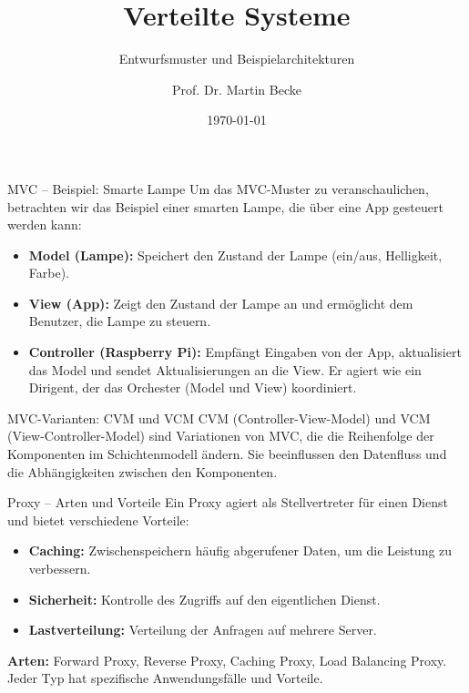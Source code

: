 \documentclass{beamer}
\title{Verteilte Systeme}
\subtitle{Entwurfsmuster und Beispielarchitekturen}
\author{Prof. Dr. Martin Becke}
\date{\today}
\begin{document}
\begin{frame}
    \titlepage
\end{frame}

\begin{frame}{MVC – Beispiel: Smarte Lampe}
    Um das MVC-Muster zu veranschaulichen, betrachten wir das Beispiel einer smarten Lampe, die über eine App gesteuert werden kann:
    \begin{itemize}
        \item \textbf{Model (Lampe):} Speichert den Zustand der Lampe (ein/aus, Helligkeit, Farbe).
        \item \textbf{View (App):} Zeigt den Zustand der Lampe an und ermöglicht dem Benutzer, die Lampe zu steuern.
        \item \textbf{Controller (Raspberry Pi):} Empfängt Eingaben von der App, aktualisiert das Model und sendet Aktualisierungen an die View. Er agiert wie ein Dirigent, der das Orchester (Model und View) koordiniert.
    \end{itemize}
\end{frame}

\begin{frame}{MVC-Varianten: CVM und VCM}
    CVM (Controller-View-Model) und VCM (View-Controller-Model) sind Variationen von MVC, die die Reihenfolge der Komponenten im Schichtenmodell ändern. Sie beeinflussen den Datenfluss und die Abhängigkeiten zwischen den Komponenten.
\end{frame}

\begin{frame}{Proxy – Arten und Vorteile}
    Ein Proxy agiert als Stellvertreter für einen Dienst und bietet verschiedene Vorteile:
    \begin{itemize}
        \item \textbf{Caching:} Zwischenspeichern häufig abgerufener Daten, um die Leistung zu verbessern.
        \item \textbf{Sicherheit:} Kontrolle des Zugriffs auf den eigentlichen Dienst.
        \item \textbf{Lastverteilung:} Verteilung der Anfragen auf mehrere Server.
    \end{itemize}

    \textbf{Arten:} Forward Proxy, Reverse Proxy, Caching Proxy, Load Balancing Proxy. Jeder Typ hat spezifische Anwendungsfälle und Vorteile.
\end{frame}
\end{document}
